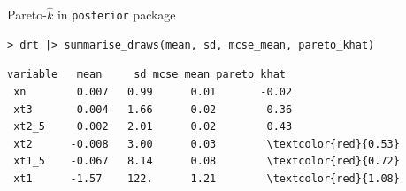 \documentclass[english,t]{beamer}
\begin{document}
\begin{frame}[fragile]{Pareto-$\hat{k}$ in \texttt{posterior} package}

  {\color{gray}
\begin{verbatim}
> drt |> summarise_draws(mean, sd, mcse_mean, pareto_khat)
\end{verbatim}
    }
\begin{Verbatim}[commandchars=\\\{\}]
 variable   mean     sd mcse_mean pareto_khat
 xn        0.007   0.99      0.01       -0.02
 xt3       0.004   1.66      0.02        0.36
 xt2_5     0.002   2.01      0.02        0.43
 xt2      -0.008   3.00      0.03        \textcolor{red}{0.53}
 xt1_5    -0.067   8.14      0.08        \textcolor{red}{0.72}
 xt1      -1.57    122.      1.21        \textcolor{red}{1.08}  
\end{Verbatim}


\end{frame}





\end{document}
